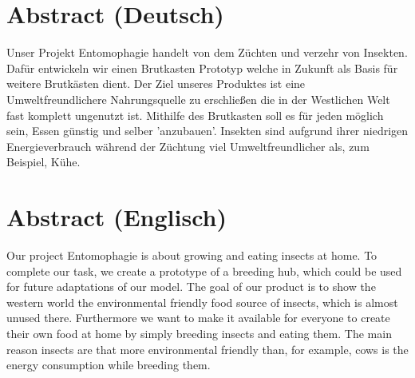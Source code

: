 \chapter*{Abstract (Deutsch)}
Unser Projekt Entomophagie handelt von dem Züchten und verzehr von Insekten. Dafür entwickeln wir einen Brutkasten Prototyp welche in Zukunft als Basis für weitere Brutkästen dient. Der Ziel unseres Produktes ist eine Umweltfreundlichere Nahrungsquelle zu erschließen die in der Westlichen Welt fast komplett ungenutzt ist. Mithilfe des Brutkasten soll es für jeden möglich sein, Essen günstig und selber 'anzubauen'. Insekten sind aufgrund ihrer niedrigen Energieverbrauch während der Züchtung viel Umweltfreundlicher als, zum Beispiel, Kühe.

\chapter*{Abstract (Englisch)}
Our project Entomophagie is about growing and eating insects at home. To complete our task, we create a prototype of a breeding hub, which could be used for future adaptations of our model. The goal of our product is to show the western world the environmental friendly food source of insects, which is almost unused there. Furthermore we want to make it available for everyone to create their own food at home by simply breeding insects and eating them. The main reason insects are that more environmental friendly than, for example, cows is the energy consumption while breeding them.